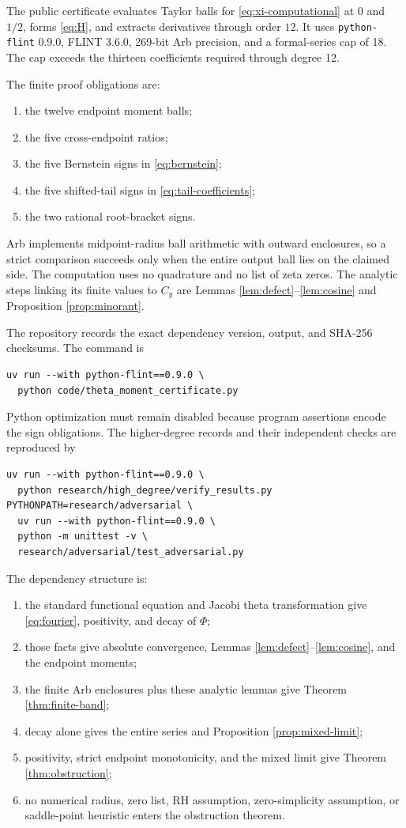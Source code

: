 \documentclass[11pt]{amsart}
\theoremstyle{remark}
\begin{document}
The public certificate evaluates Taylor balls for \eqref{eq:xi-computational}
at $0$ and $1/2$, forms \eqref{eq:H}, and extracts derivatives through order
$12$.  It uses \texttt{python-flint} 0.9.0, FLINT 3.6.0, 269-bit Arb precision, and a
formal-series cap of 18.  The cap exceeds the thirteen coefficients required
through degree 12.

The finite proof obligations are:
\begin{enumerate}
\item the twelve endpoint moment balls;
\item the five cross-endpoint ratios;
\item the five Bernstein signs in \eqref{eq:bernstein};
\item the five shifted-tail signs in \eqref{eq:tail-coefficients};
\item the two rational root-bracket signs.
\end{enumerate}
Arb implements midpoint-radius ball arithmetic with outward enclosures, so a
strict comparison succeeds only when the entire output ball lies on the
claimed side.  The computation uses no quadrature and no list of zeta zeros.
The analytic steps linking its finite values to $C_y$ are Lemmas
\ref{lem:defect}--\ref{lem:cosine} and Proposition \ref{prop:minorant}.

The repository records the exact dependency version, output, and SHA-256
checksums.  The command is
\begin{verbatim}
uv run --with python-flint==0.9.0 \
  python code/theta_moment_certificate.py
\end{verbatim}
Python optimization must remain disabled because program assertions encode
the sign obligations.  The higher-degree records and their independent
checks are reproduced by
\begin{verbatim}
uv run --with python-flint==0.9.0 \
  python research/high_degree/verify_results.py
PYTHONPATH=research/adversarial \
  uv run --with python-flint==0.9.0 \
  python -m unittest -v \
  research/adversarial/test_adversarial.py
\end{verbatim}

The dependency structure is:
\begin{enumerate}
\item the standard functional equation and Jacobi theta transformation give
      \eqref{eq:fourier}, positivity, and decay of $\Phi$;
\item those facts give absolute convergence, Lemmas
      \ref{lem:defect}--\ref{lem:cosine}, and the endpoint moments;
\item the finite Arb enclosures plus these analytic lemmas give Theorem
      \ref{thm:finite-band};
\item decay alone gives the entire series and Proposition
      \ref{prop:mixed-limit};
\item positivity, strict endpoint monotonicity, and the mixed limit give
      Theorem \ref{thm:obstruction};
\item no numerical radius, zero list, RH assumption, zero-simplicity
      assumption, or saddle-point heuristic enters the obstruction theorem.
\end{enumerate}
\end{document}
